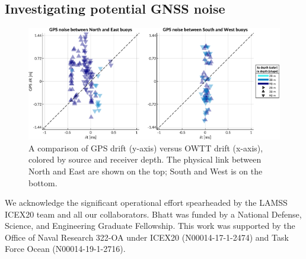\subsection{Investigating potential GNSS noise}

\begin{figure}[h!]
	\centering
	\includegraphics[width=\reprintcolumnwidth]{figs/gps-drift-example.pdf} 
	\caption{A comparison of GPS drift (y-axis) versus OWTT drift (x-axis), colored by source and receiver depth. The physical link between North and East are shown on the top; South and West is on the bottom.}
	\label{fig:gps-drift-example}
\end{figure}



\FloatBarrier
\clearpage
\begin{acknowledgments}
We acknowledge the significant operational effort spearheaded by the LAMSS ICEX20 team and all our collaborators.
Bhatt was funded by a National Defense, Science, and Engineering Graduate Fellowship.
This work was supported by the Office of Naval Research 322-OA under ICEX20 (N00014-17-1-2474) and Task Force Ocean (N00014-19-1-2716).

\end{acknowledgments}


